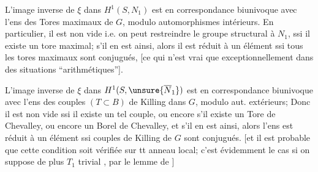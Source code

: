 L'image inverse de $\xi$ dans $H^1(S,N_1)$ est en correspondance biunivoque avec l'ens des Tores maximaux de $G$, modulo automorphismes intérieurs. En particulier, il est non vide  i.e. on peut restreindre le groupe structural à $N_1$, ssi il existe un tore maximal; s'il en est ainsi, alors il est réduit à un élément ssi tous les tores maximaux sont conjugués, [ce qui n'est vrai que exceptionnellement dans des situations ``arithmétiques''].



L'image inverse de $\xi$ dans $H^1(S,\unsure{\overline N_1})$ est en correspondance biunivoque avec l'ens des couples $(T\subset B)$ de Killing dans $G$, modulo aut. extérieurs; Donc il est non vide ssi il existe un tel couple, ou encore s'il existe un Tore  de Chevalley, ou encore un Borel de Chevalley,  et  s'il en est ainsi, alors l'ens est réduit à un élément ssi  couples de Killing de $G$ sont conjugués.
[et il est probable que cette condition soit vérifiée sur tt anneau local; c'est évidemment le cas si on suppose de plus $T_1$ trivial \inserted{[i.e. $\rho=0$]}, par le lemme de ]

